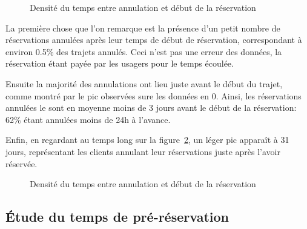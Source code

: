 \documentclass[12pt,a4paper]{article}
\newcommand{\1}[1]{\mathbbm{1}_{\{#1\}} }
\theoremstyle{definition}
\begin{document}
{\begin{figure}[!h]
\centering
{}
\caption{Densité du temps entre annulation et début de la réservation}
\label{délai_annulation_début}
\end{figure}


La première chose que l'on remarque est la présence d'un petit nombre de réservations annulées après leur temps de début de réservation, correspondant à environ 0.5\% des trajets annulés. Ceci n'est pas une erreur des données, la réservation étant payée par les usagers pour le temps écoulée.

Ensuite la majorité des annulations ont lieu juste avant le début du trajet, comme montré par le pic observées sure les données en 0. Ainsi, les réservations annulées le sont en moyenne moins de 3 jours avant le début de la réservation: 62\% étant annulées moins de 24h à l'avance.

Enfin, en regardant au temps long sur la figure~\ref{délai_annulation_jours}, un léger pic apparaît à 31 jours, représentant les clients annulant leur réservations juste après l'avoir réservée.


\begin{figure}[!h]
\centering
{}
\caption{Densité du temps entre annulation et début de la réservation}
\label{délai_annulation_jours}
\end{figure}

\subsection{Étude du temps de pré-réservation}

}
\end{document}

